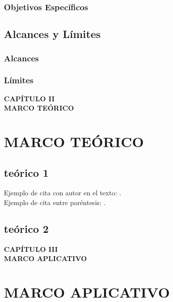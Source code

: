 \documentclass[11pt,oneside,letterpaper]{book}
\begin{document}
\subsection{Objetivos Específicos}
\lipsum[1]

\section{Alcances y Límites}
\lipsum[1]

\subsection{Alcances}
\lipsum[1]

\subsection{Límites}
\lipsum[1]

\newpage
\thispagestyle{empty}
\vspace*{0.35\textheight}
\begin{center}
	{\Huge\textbf{CAPÍTULO II}} \\[0.5cm]
	{\Huge\textbf{MARCO TEÓRICO}}
\end{center}

\newpage
\chapter{MARCO TEÓRICO}
\thispagestyle{fancy}
\section{teórico 1}
\lipsum[1]
Ejemplo de cita con autor en el texto: \textcite{perez2021educacion}.\\
Ejemplo de cita entre paréntesis: \parencite{smith2020ai}.

\section{teórico 2}
\lipsum[1]

\newpage
\thispagestyle{empty}
\vspace*{0.35\textheight}
\begin{center}
	{\Huge\textbf{CAPÍTULO III}} \\[0.5cm]
	{\Huge\textbf{MARCO APLICATIVO}}
\end{center}

\newpage
\chapter{MARCO APLICATIVO}
\thispagestyle{fancy}
\end{document}
